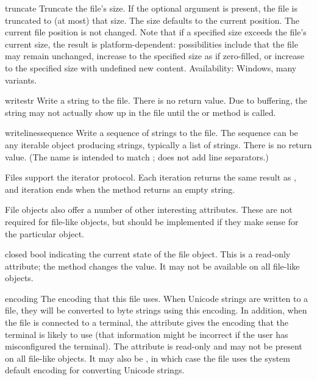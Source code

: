 \begin{methoddesc}[file]{truncate}{}
  Truncate the file's size.  If the optional  argument is
  present, the file is truncated to (at most) that size.  The size
  defaults to the current position.  The current file position is
  not changed.  Note that if a specified size exceeds the file's
  current size, the result is platform-dependent:  possibilities
  include that the file may remain unchanged, increase to the specified
  size as if zero-filled, or increase to the specified size with
  undefined new content.
  Availability:  Windows, many \UNIX{} variants.
\end{methoddesc}

\begin{methoddesc}[file]{write}{str}
  Write a string to the file.  There is no return value.  Due to
  buffering, the string may not actually show up in the file until
  the  or  method is called.
\end{methoddesc}

\begin{methoddesc}[file]{writelines}{sequence}
  Write a sequence of strings to the file.  The sequence can be any
  iterable object producing strings, typically a list of strings.
  There is no return value.
  (The name is intended to match ;
   does not add line separators.)
\end{methoddesc}


Files support the iterator protocol.  Each iteration returns the same
result as , and iteration ends when the
 method returns an empty string.


File objects also offer a number of other interesting attributes.
These are not required for file-like objects, but should be
implemented if they make sense for the particular object.

\begin{memberdesc}[file]{closed}
bool indicating the current state of the file object.  This is a
read-only attribute; the  method changes the value.
It may not be available on all file-like objects.
\end{memberdesc}

\begin{memberdesc}[file]{encoding}
The encoding that this file uses. When Unicode strings are written
to a file, they will be converted to byte strings using this encoding.
In addition, when the file is connected to a terminal, the attribute
gives the encoding that the terminal is likely to use (that 
information might be incorrect if the user has misconfigured the 
terminal). The attribute is read-only and may not be present on
all file-like objects. It may also be , in which case
the file uses the system default encoding for converting Unicode
strings.

\end{memberdesc}

